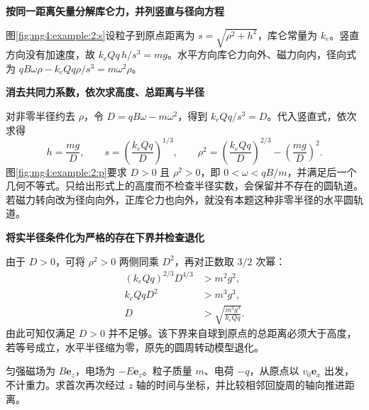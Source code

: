 \begin{solution}\textbf{按同一距离矢量分解库仑力，并列竖直与径向方程}\par\nobreak
图\ref{fig:mg4:example:2:s}设粒子到原点距离为 $s=\sqrt{\rho^2+h^2}$，库仑常量为 $k_e$。竖直方向没有加速度，故 $k_eQq\,h/s^3=mg$。水平方向库仑力向外、磁力向内，径向式为 $qB\omega\rho-k_eQq\rho/s^3=m\omega^2\rho$。



\par\medskip{}\noindent\textbf{消去共同力系数，依次求高度、总距离与半径}\par\nobreak
对非零半径约去 $\rho$，令 $D=qB\omega-m\omega^2$，得到 $k_eQq/s^3=D$。代入竖直式，依次求得
\[
h=\frac{mg}{D},\qquad s=\left(\frac{k_eQq}{D}\right)^{1/3},\qquad
\rho^2=\left(\frac{k_eQq}{D}\right)^{2/3}-\left(\frac{mg}{D}\right)^2.
\]
图\ref{fig:mg4:example:2:p}要求 $D>0$ 且 $\rho^2>0$，即 $0<\omega<qB/m$，并满足后一个几何不等式。只给出形式上的高度而不检查半径实数，会保留并不存在的圆轨道。若磁力转向改为径向向外，正库仑力也向外，就没有本题这种非零半径的水平圆轨道。



\par\medskip{}\noindent\textbf{将实半径条件化为严格的存在下界并检查退化}\par\nobreak
由于 $D>0$，可将 $\rho^2>0$ 两侧同乘 $D^2$，再对正数取 $3/2$ 次幂：
\[
 \begin{aligned}
 (k_eQq)^{2/3}D^{4/3}&>m^2g^2,\\
 k_eQqD^2&>m^3g^3,\\
 D&>\sqrt{\frac{m^3g^3}{k_eQq}}.
 \end{aligned}
\]
由此可知仅满足 $D>0$ 并不足够。该下界来自球到原点的总距离必须大于高度，若等号成立，水平半径缩为零，原先的圆周转动模型退化。\end{solution}
\begin{question}\begin{example}[平行电磁场中再次经过轴线]\label{mg4:example:3}
匀强磁场为 $B\bm e_z$，电场为 $-E\bm e_z$。粒子质量 $m$、电荷 $-q$，从原点以 $v_0\bm e_x$ 出发，不计重力。求首次再次经过 $z$ 轴的时间与坐标，并比较相邻回旋周的轴向推进距离。
\end{example}
\end{question}
